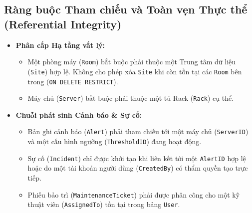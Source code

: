\subsection{Ràng buộc Tham chiếu và Toàn vẹn Thực thể (Referential Integrity)}
\begin{itemize}[leftmargin=2em]
    \item \textbf{Phân cấp Hạ tầng vất lý:} 
    \begin{itemize}
        \item Một phòng máy (\texttt{Room}) bắt buộc phải thuộc một Trung tâm dữ liệu (\texttt{Site}) hợp lệ. Không cho phép xóa \texttt{Site} khi còn tồn tại các \texttt{Room} bên trong (\texttt{ON DELETE RESTRICT}).
        \item Máy chủ (\texttt{Server}) bắt buộc phải thuộc một tủ Rack (\texttt{Rack}) cụ thể.
    \end{itemize}
    \item \textbf{Chuỗi phát sinh Cảnh báo \& Sự cố:}
    \begin{itemize}
        \item Bản ghi cảnh báo (\texttt{Alert}) phải tham chiếu tới một máy chủ (\texttt{ServerID}) và một cấu hình ngưỡng (\texttt{ThresholdID}) đang hoạt động.
        \item Sự cố (\texttt{Incident}) chỉ được khởi tạo khi liên kết tới một \texttt{AlertID} hợp lệ hoặc do một tài khoản người dùng (\texttt{CreatedBy}) có thẩm quyền tạo trực tiếp.
        \item Phiếu bảo trì (\texttt{MaintenanceTicket}) phải được phân công cho một kỹ thuật viên (\texttt{AssignedTo}) tồn tại trong bảng \texttt{User}.
    \end{itemize}
\end{itemize}

